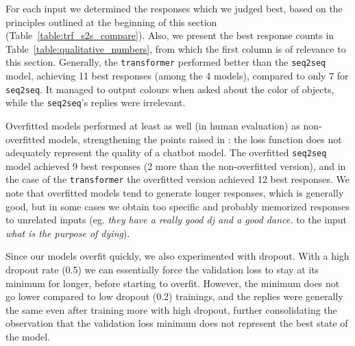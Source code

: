 \documentclass[11pt,a4paper]{article}
\begin{document}
For each input we determined the responses which we judged best, based on the
principles outlined at the beginning of this section (Table~\ref{table:trf_s2s_compare}). Also, we present the best response counts in Table~\ref{table:qualitative_numbers}, from which the first column is of relevance to this section. Generally,
the \texttt{transformer} performed better than the \texttt{seq2seq} model, achieving 11 best responses (among the 4 models), compared to only 7 for \texttt{seq2seq}. It managed to output colours when asked about the color of objects, while the \texttt{seq2seq}'s replies were irrelevant.

Overfitted models performed at least as well (in human evaluation) as non-overfitted models,
strengthening the points raised in \citet{Csaky:2017, Tandon:2017}: the loss
function does not adequately represent the quality of a chatbot model. The overfitted \texttt{seq2seq} model achieved 9 best responses (2 more than the non-overfitted version), and in the case of the \texttt{transformer} the overfitted version achieved 12 best responses. We note that overfitted models tend to generate longer responses, which is generally good, but in some cases we obtain too specific
and probably memorized responses to unrelated inputs (eg. \textit{they have a
  really good dj and a good dance.}  to the input \textit{what is the purpose of
  dying}).

Since our models overfit quickly, we also experimented with dropout.
With a high dropout rate (0.5) we can essentially force the validation loss to stay at its minimum
for longer, before starting to overfit. However, the minimum does not
go lower compared to low dropout (0.2) trainings, and the replies were generally the
same even after training more with high dropout, further consolidating
the observation
that the validation loss minimum does not represent the best state of the model.
\end{document}
